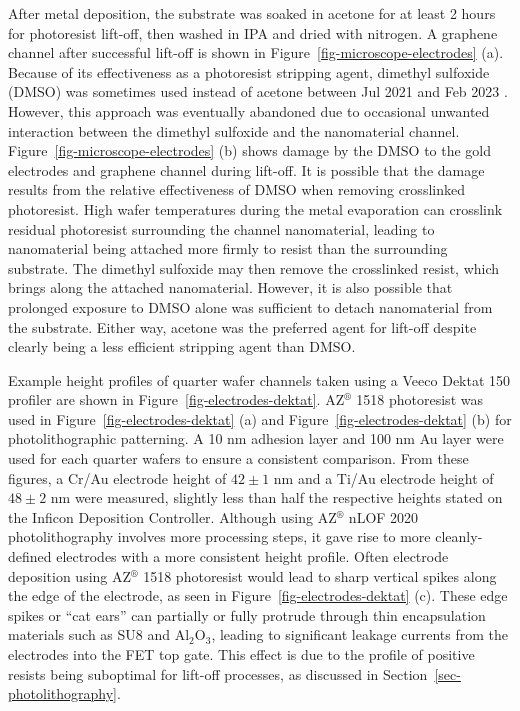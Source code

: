 \documentclass[
  a4paper,
]{scrbook}
\begin{document}
After metal deposition, the substrate was soaked in acetone for at least
2 hours for photoresist lift-off, then washed in IPA and dried with
nitrogen. A graphene channel after successful lift-off is shown in
Figure~\ref{fig-microscope-electrodes} (a). Because of its effectiveness
as a photoresist stripping agent, dimethyl sulfoxide (DMSO) was
sometimes used instead of acetone between Jul 2021 and Feb 2023
\autocite{Microchemicals2}. However, this approach was eventually
abandoned due to occasional unwanted interaction between the dimethyl
sulfoxide and the nanomaterial channel.
Figure~\ref{fig-microscope-electrodes} (b) shows damage by the DMSO to
the gold electrodes and graphene channel during lift-off. It is possible
that the damage results from the relative effectiveness of DMSO when
removing crosslinked photoresist. High wafer temperatures during the
metal evaporation can crosslink residual photoresist surrounding the
channel nanomaterial, leading to nanomaterial being attached more firmly
to resist than the surrounding substrate. The dimethyl sulfoxide may
then remove the crosslinked resist, which brings along the attached
nanomaterial. However, it is also possible that prolonged exposure to
DMSO alone was sufficient to detach nanomaterial from the substrate.
Either way, acetone was the preferred agent for lift-off despite clearly
being a less efficient stripping agent than DMSO.

Example height profiles of quarter wafer channels taken using a Veeco
Dektat 150 profiler are shown in Figure~\ref{fig-electrodes-dektat}.
AZ\(^\circledR\) 1518 photoresist was used in
Figure~\ref{fig-electrodes-dektat} (a) and
Figure~\ref{fig-electrodes-dektat} (b) for photolithographic patterning.
A 10 nm adhesion layer and 100 nm Au layer were used for each quarter
wafers to ensure a consistent comparison. From these figures, a Cr/Au
electrode height of \(42\pm1\) nm and a Ti/Au electrode height of
\(48\pm2\) nm were measured, slightly less than half the respective
heights stated on the Inficon Deposition Controller. Although using
AZ\(^\circledR\) nLOF 2020 photolithography involves more processing
steps, it gave rise to more cleanly-defined electrodes with a more
consistent height profile. Often electrode deposition using
AZ\(^\circledR\) 1518 photoresist would lead to sharp vertical spikes
along the edge of the electrode, as seen in
Figure~\ref{fig-electrodes-dektat} (c). These edge spikes or ``cat
ears'' can partially or fully protrude through thin encapsulation
materials such as SU8 and Al\(_2\)O\(_3\), leading to significant
leakage currents from the electrodes into the FET top gate. This effect
is due to the profile of positive resists being suboptimal for lift-off
processes, as discussed in Section~\ref{sec-photolithography}.
\end{document}
